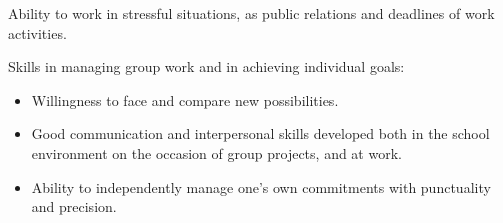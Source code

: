 \begin{keywords}
	 {Ability to work in stressful situations, as public relations and deadlines of work activities.}
		 {Skills in managing group work and in achieving individual goals:
   \begin{itemize}
       \item Willingness to face and compare new possibilities.
        \item Good communication and interpersonal skills developed both in the school environment on the occasion of group projects, and at work.
        \item Ability to independently manage one's own commitments with punctuality and precision.
		\end{itemize}
	}
	
\end{keywords}